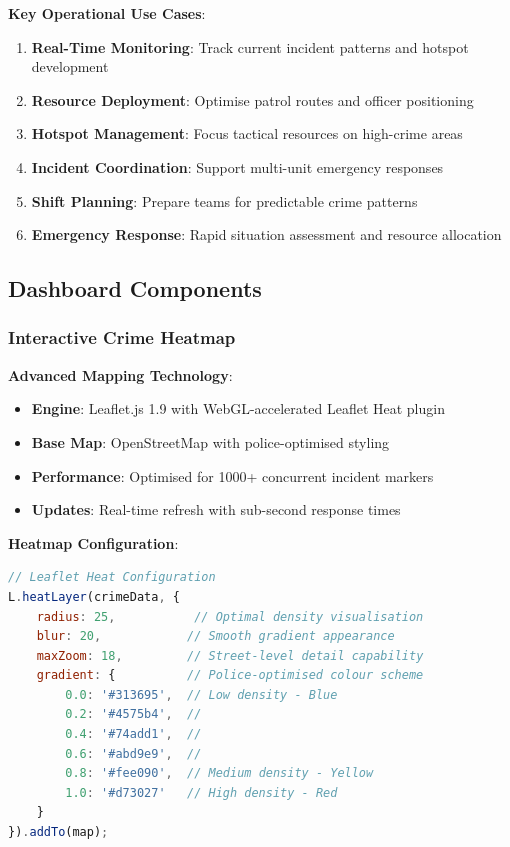 \documentclass[12pt,a4paper]{article}
\begin{document}
\textbf{Key Operational Use Cases}:
\begin{enumerate}
    \item \textbf{Real-Time Monitoring}: Track current incident patterns and hotspot development
    \item \textbf{Resource Deployment}: Optimise patrol routes and officer positioning
    \item \textbf{Hotspot Management}: Focus tactical resources on high-crime areas
    \item \textbf{Incident Coordination}: Support multi-unit emergency responses
    \item \textbf{Shift Planning}: Prepare teams for predictable crime patterns
    \item \textbf{Emergency Response}: Rapid situation assessment and resource allocation
\end{enumerate}

\subsection{Dashboard Components}

\subsubsection{Interactive Crime Heatmap}

\textbf{Advanced Mapping Technology}:
\begin{itemize}
    \item \textbf{Engine}: Leaflet.js 1.9 with WebGL-accelerated Leaflet Heat plugin
    \item \textbf{Base Map}: OpenStreetMap with police-optimised styling
    \item \textbf{Performance}: Optimised for 1000+ concurrent incident markers
    \item \textbf{Updates}: Real-time refresh with sub-second response times
\end{itemize}

\textbf{Heatmap Configuration}:
\begin{lstlisting}[language=JavaScript]
// Leaflet Heat Configuration
L.heatLayer(crimeData, {
    radius: 25,           // Optimal density visualisation
    blur: 20,            // Smooth gradient appearance  
    maxZoom: 18,         // Street-level detail capability
    gradient: {          // Police-optimised colour scheme
        0.0: '#313695',  // Low density - Blue
        0.2: '#4575b4',  // 
        0.4: '#74add1',  // 
        0.6: '#abd9e9',  // 
        0.8: '#fee090',  // Medium density - Yellow
        1.0: '#d73027'   // High density - Red
    }
}).addTo(map);
\end{lstlisting}
\end{document}
